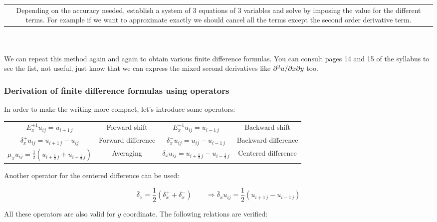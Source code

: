 \begin{tabular}{|c}
	\begin{minipage}{\textwidth}
	Depending on the accuracy needed, establish a system of 3 equations of 3 variables and solve by imposing the value for the different terms. For example if we want to approximate exactly we should cancel all the terms except the second order derivative term. 
	\end{minipage}
	\end{tabular}

\ \\\\
We can repeat this method again and again to obtain various finite difference formulas. You can consult pages 14 and 15 of the syllabus to see the list, not useful, just know that we can express the mixed second derivatives like $\partial ^2u/\partial x\partial y$ too. 

\subsubsection{Derivation of finite difference formulas using operators}
In order to make the writing more compact, let's introduce some operators:
\begin{center}
\begin{tabular}{cc|cc}
$E_x^{+1}u_{ij} = u_{i+1\, j}$ & Forward shift &  $E_x^{-1}u_{ij} = u_{i-1\, j}$ & Backward shift\\
$\delta_x^{+}u_{ij} = u_{i+1\, j} - u_{ij}$ & Forward difference & $\delta_x^{-}u_{ij} =  u_{ij} - u_{i-1\, j}$ & Backward difference \\
$\mu _x u_{ij} = \frac{1}{2} \left(u_{i+\frac{1}{2} \, j}+u_{i-\frac{1}{2} \, j}\right)$ & Averaging & $\delta _xu_{ij} = u_{i+\frac{1}{2} \, j}-u_{i-\frac{1}{2} \, j}$ & Centered difference\\
\end{tabular}
\end{center}

Another operator for the centered difference can be used: 

\begin{equation}
\bar{\delta}_x = \frac{1}{2}\left(\delta ^+_x + \delta ^-_x\right) \qquad \Rightarrow \bar{\delta}_x u_{ij} = \frac{1}{2} \left( u_{i+1\, j} - u_{i-1 \, j} \right) 
\end{equation}

All these operators are also valid for $y$ coordinate. The following relations are verified: 

